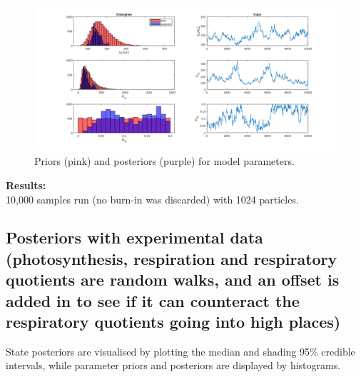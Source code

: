 \documentclass{ruthesis}
\begin{document}
\begin{figure}
	\centerline{\includegraphics[width=1.3\textwidth]{images_microalgae/plots_iterative/model_parameters}}
	\caption[.]{Priors (pink) and posteriors (purple) for model parameters.}
	\label{fig:micro_exp_iterative_parameters_model}
\end{figure}


\textbf{Results:}\\
10,000 samples run (no burn-in was discarded) with 1024 particles.




\FloatBarrier
\subsection{Posteriors with experimental data (photosynthesis, respiration and respiratory quotients are random walks, and an offset is added in to see if it can counteract the respiratory quotients going into high places)}


State posteriors are visualised by plotting the median and shading 95\% credible intervals, while parameter priors and posteriors are displayed by histograms.
\end{document}
